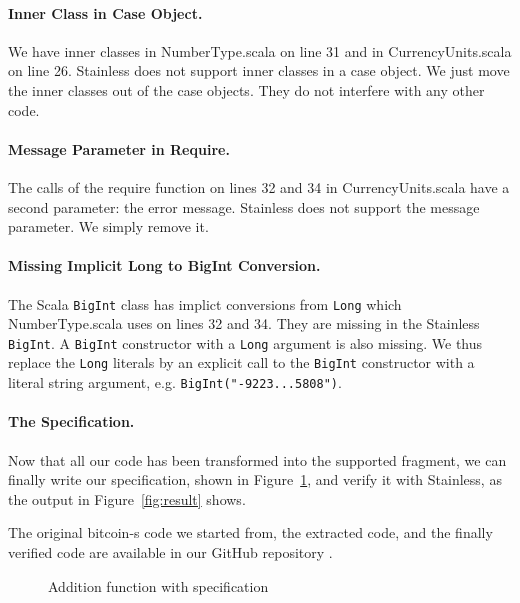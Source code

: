 \documentclass[hyphens, a4paper,USenglish,cleveref, autoref, thm-restate]{oasics-v2019}
\begin{document}
\paragraph{Inner Class in Case Object.} We have inner classes in
NumberType.scala on line 31 and in CurrencyUnits.scala on line
26. Stainless does not support inner classes in a case object. We just
move the inner classes out of the case objects. They do not interfere
with any other code.

\paragraph{Message Parameter in Require.} The calls of the require
function on lines 32 and 34 in CurrencyUnits.scala have a second
parameter: the error message. Stainless does not support the message
parameter. We simply remove it.

\paragraph{Missing Implicit Long to BigInt Conversion.} The Scala
\texttt{BigInt} class has implict conversions from \texttt{Long} which
NumberType.scala uses on lines 32 and 34. They are missing in the
Stainless \texttt{BigInt}. A \texttt{BigInt} constructor with a
\texttt{Long} argument is also missing. We thus replace the
\texttt{Long} literals by an explicit call to the \texttt{BigInt}
constructor with a literal string argument,
e.g. \texttt{BigInt("-9223...5808")}.


\paragraph{The Specification.} Now that all our code has been
transformed into the supported fragment, we can finally write our
specification, shown in Figure~\ref{fig:spec}, and verify it with
Stainless, as the output in Figure~\ref{fig:result} shows.

The original bitcoin-s code we started from, the extracted code, and
the finally verified code are available in our GitHub repository \cite{verification:github}.

\begin{figure}

\caption{Addition function with specification}
\label{fig:spec}
\end{figure}
\end{document}
